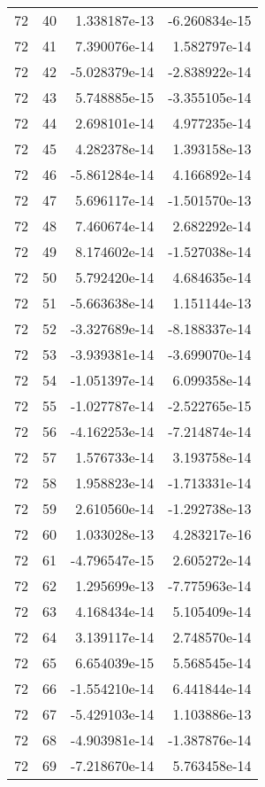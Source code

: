 \begin{tabular}{rrrr}
  72 &   40 &  1.338187e-13 & -6.260834e-15 \\
  72 &   41 &  7.390076e-14 &  1.582797e-14 \\
  72 &   42 & -5.028379e-14 & -2.838922e-14 \\
  72 &   43 &  5.748885e-15 & -3.355105e-14 \\
  72 &   44 &  2.698101e-14 &  4.977235e-14 \\
  72 &   45 &  4.282378e-14 &  1.393158e-13 \\
  72 &   46 & -5.861284e-14 &  4.166892e-14 \\
  72 &   47 &  5.696117e-14 & -1.501570e-13 \\
  72 &   48 &  7.460674e-14 &  2.682292e-14 \\
  72 &   49 &  8.174602e-14 & -1.527038e-14 \\
  72 &   50 &  5.792420e-14 &  4.684635e-14 \\
  72 &   51 & -5.663638e-14 &  1.151144e-13 \\
  72 &   52 & -3.327689e-14 & -8.188337e-14 \\
  72 &   53 & -3.939381e-14 & -3.699070e-14 \\
  72 &   54 & -1.051397e-14 &  6.099358e-14 \\
  72 &   55 & -1.027787e-14 & -2.522765e-15 \\
  72 &   56 & -4.162253e-14 & -7.214874e-14 \\
  72 &   57 &  1.576733e-14 &  3.193758e-14 \\
  72 &   58 &  1.958823e-14 & -1.713331e-14 \\
  72 &   59 &  2.610560e-14 & -1.292738e-13 \\
  72 &   60 &  1.033028e-13 &  4.283217e-16 \\
  72 &   61 & -4.796547e-15 &  2.605272e-14 \\
  72 &   62 &  1.295699e-13 & -7.775963e-14 \\
  72 &   63 &  4.168434e-14 &  5.105409e-14 \\
  72 &   64 &  3.139117e-14 &  2.748570e-14 \\
  72 &   65 &  6.654039e-15 &  5.568545e-14 \\
  72 &   66 & -1.554210e-14 &  6.441844e-14 \\
  72 &   67 & -5.429103e-14 &  1.103886e-13 \\
  72 &   68 & -4.903981e-14 & -1.387876e-14 \\
  72 &   69 & -7.218670e-14 &  5.763458e-14 \\

\end{tabular}
